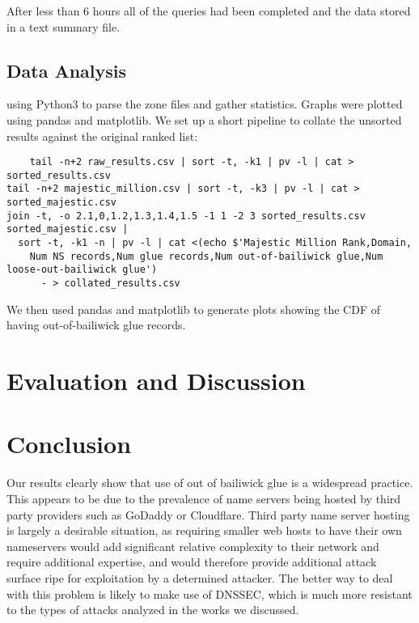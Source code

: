\documentclass{idc_msc}
\begin{document}
After less than 6 hours all of the queries had been completed and the data stored in a text summary file.

\subsection{Data Analysis}

using Python3 to parse the zone files and gather statistics. Graphs were plotted using pandas and matplotlib.
We set up a short pipeline to collate the unsorted results against the original ranked list:
\begin{verbatim}
	tail -n+2 raw_results.csv | sort -t, -k1 | pv -l | cat > sorted_results.csv
tail -n+2 majestic_million.csv | sort -t, -k3 | pv -l | cat > sorted_majestic.csv
join -t, -o 2.1,0,1.2,1.3,1.4,1.5 -1 1 -2 3 sorted_results.csv sorted_majestic.csv | 
  sort -t, -k1 -n | pv -l | cat <(echo $'Majestic Million Rank,Domain,
    Num NS records,Num glue records,Num out-of-bailiwick glue,Num loose-out-bailiwick glue') 
      - > collated_results.csv
\end{verbatim}
We then used pandas and matplotlib to generate plots showing the CDF of having out-of-bailiwick glue records.





\section{Evaluation and Discussion}




\section{Conclusion}
Our results clearly show that use of out of bailiwick glue is a widespread practice. This appears to be due to the prevalence of name servers being hosted by third party providers such as GoDaddy or Cloudflare. Third party name server hosting is largely a desirable situation, as requiring smaller web hosts to have their own nameservers would add significant relative complexity to their network and require additional expertise, and would therefore provide additional attack surface ripe for exploitation by a determined attacker. The better way to deal with this problem is likely to make use of DNSSEC, which is much more resistant to the types of attacks analyzed in the works we discussed.
\end{document}
